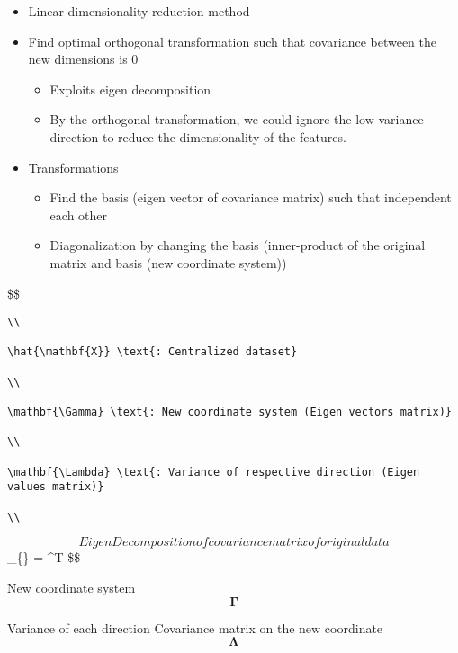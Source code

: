 \documentclass[11pt]{article}
\providecommand{\tightlist}{%
      \setlength{\itemsep}{0pt}\setlength{\parskip}{0pt}}
\begin{document}
\begin{itemize}
\tightlist
\item
  Linear dimensionality reduction method
\item
  Find optimal orthogonal transformation such that covariance between
  the new dimensions is 0

  \begin{itemize}
  \tightlist
  \item
    Exploits eigen decomposition
  \item
    By the orthogonal transformation, we could ignore the low variance
    direction to reduce the dimensionality of the features.
  \end{itemize}
\item
  Transformations

  \begin{itemize}
  \tightlist
  \item
    Find the basis (eigen vector of covariance matrix) such that
    independent each other
  \item
    Diagonalization by changing the basis (inner-product of the original
    matrix and basis (new coordinate system))
  \end{itemize}
\end{itemize}

\$\$  

\begin{verbatim}
\\

\hat{\mathbf{X}} \text{: Centralized dataset}

\\

\mathbf{\Gamma} \text{: New coordinate system (Eigen vectors matrix)}

\\

\mathbf{\Lambda} \text{: Variance of respective direction (Eigen values matrix)}

\\
\end{verbatim}

\[
Eigen Decomposition of covariance matrix of original data
\] \Sigma\_\{\} = \mathbf{\Gamma} \mathbf{\Lambda}
\mathbf{\Gamma}\^{}T \$\$

New coordinate system \[\mathbf{\Gamma}\]

Variance of each direction Covariance matrix on the new coordinate
\[\mathbf{\Lambda}\]
\end{document}
